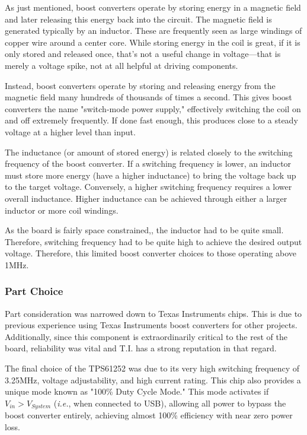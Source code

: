 \documentclass[11pt]{article}
\begin{document}
As just mentioned, boost converters operate by storing energy in a magnetic field and later releasing this energy back into the circuit.\footnotemark {} The magnetic field is generated typically by an inductor. These are frequently seen as large windings of copper wire around a center core. While storing energy in the coil is great, if it is only stored and released once, that's not a useful change in voltage—that is merely a voltage spike, not at all helpful at driving components.

Instead, boost converters operate by storing and releasing energy from the magnetic field many hundreds of thousands of times a second. This gives boost converters the name "switch-mode power supply," effectively switching the coil on and off extremely frequently. If done fast enough, this produces close to a steady voltage at a higher level than input. 

The inductance (or amount of stored energy) is related closely to the switching frequency of the boost converter. If a switching frequency is lower, an inductor must store more energy (have a higher inductance) to bring the voltage back up to the target voltage. Conversely, a higher switching frequency requires a lower overall inductance. Higher inductance can be achieved through either a larger inductor or more coil windings.

As the board is fairly space constrained,\footnotemark {}, the inductor had to be quite small. Therefore, switching frequency had to be quite high to achieve the desired output voltage. Therefore, this limited boost converter choices to those operating above 1MHz.

\subsubsection{Part Choice}

Part consideration was narrowed down to Texas Instruments chips. This is due to previous experience using Texas Instruments boost converters for other projects. Additionally, since this component is extraordinarily critical to the rest of the board, reliability was vital and T.I. has a strong reputation in that regard. 

The final choice of the TPS61252 was due to its very high switching frequency of 3.25MHz, voltage adjustability, and high current rating. This chip also provides a unique mode known as "100\% Duty Cycle Mode." This mode activates if \(V_{in} > V_{System}\) (\emph{i.e.}, when connected to USB), allowing all power to bypass the boost converter entirely, achieving almost 100\% efficiency with near zero power loss. 
\end{document}
